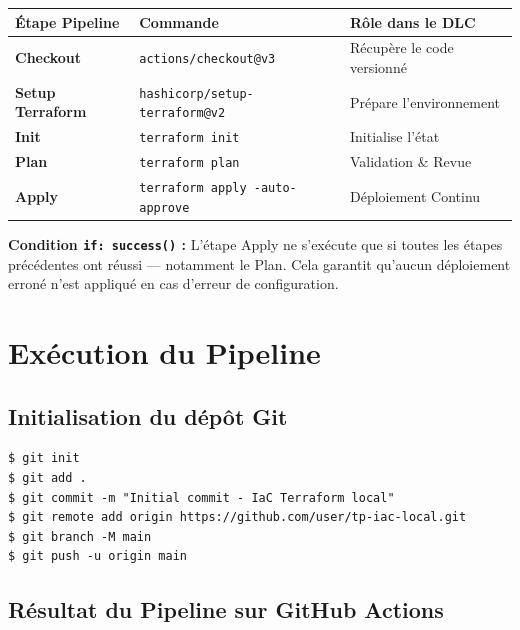\documentclass[12pt,a4paper]{article}
\begin{document}
\begin{center}
\begin{tabular}{>{\bfseries}p{4cm} p{6cm} p{5cm}}
\toprule
Étape Pipeline & Commande & Rôle dans le DLC \\
\midrule
Checkout        & \texttt{actions/checkout@v3}          & Récupère le code versionné \\
Setup Terraform & \texttt{hashicorp/setup-terraform@v2} & Prépare l'environnement \\
Init            & \texttt{terraform init}                & Initialise l'état \\
Plan            & \texttt{terraform plan}                & Validation \& Revue \\
Apply           & \texttt{terraform apply -auto-approve} & Déploiement Continu \\
\bottomrule
\end{tabular}
\end{center}

\begin{cicdbox}
\textbf{Condition \texttt{if: success()} :} L'étape Apply ne s'exécute que si
toutes les étapes précédentes ont réussi --- notamment le Plan. Cela garantit
qu'aucun déploiement erroné n'est appliqué en cas d'erreur de configuration.
\end{cicdbox}

\section{\textcolor{cicdGreen}{Exécution du Pipeline}}

\subsection{Initialisation du dépôt Git}

\begin{lstlisting}[style=termStyle, caption=Push initial vers GitHub]
$ git init
$ git add .
$ git commit -m "Initial commit - IaC Terraform local"
$ git remote add origin https://github.com/user/tp-iac-local.git
$ git branch -M main
$ git push -u origin main
\end{lstlisting}

\subsection{Résultat du Pipeline sur GitHub Actions}
\end{document}
